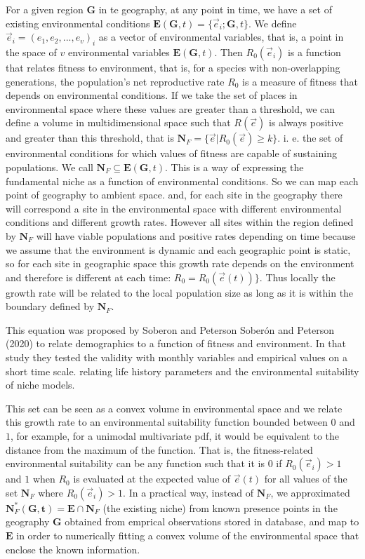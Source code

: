 \documentclass[
]{article}
\begin{document}
For a given region \(\mathbf{G}\) in te geography, at any point in time,
we have a set of existing environmental conditions
\(\mathbf{E}(\mathbf{G}, t) = \Big \{ \vec{e}_i; \mathbf{G}, t\Big \}\).
We define \(\vec{e}_i =(e_1, e_2, ..., e_v )_i\) as a vector of
environmental variables, that is, a point in the space of \(v\)
environmental variables \(\mathbf{E}(\mathbf{G}, t)\). Then
\(R_0(\vec{e}_i)\) is a function that relates fitness to environment,
that is, for a species with non-overlapping generations, the
population's net reproductive rate \(R_0\) is a measure of fitness that
depends on environmental conditions. If we take the set of places in
environmental space where these values are greater than a threshold, we
can define a volume in multidimensional space such that \(R(\vec{e})\)
is always positive and greater than this threshold, that is
\(\mathbf{N}_F=\{\vec{e} | R_0(\vec{e}) \ge k \}\). i. e. the set of
environmental conditions for which values of fitness are capable of
sustaining populations. We call
\(\mathbf{N}_F \subseteq \mathbf{E}(\mathbf{G}, t)\). This is a way of
expressing the fundamental niche as a function of environmental
conditions. So we can map each point of geography to ambient space. and,
for each site in the geography there will correspond a site in the
environmental space with different environmental conditions and
different growth rates. However all sites within the region defined by
\(\mathbf{N}_F\) will have viable populations and positive rates
depending on time because we assume that the environment is dynamic and
each geographic point is static, so for each site in geographic space
this growth rate depends on the environment and therefore is different
at each time: \(R_0 = R_0(\vec{e}(t)) \}\). Thus locally the growth rate
will be related to the local population size as long as it is within the
boundary defined by \(\mathbf{N}_F\).

This equation was proposed by Soberon and Peterson Soberón and Peterson
(2020) to relate demographics to a function of fitness and environment.
In that study they tested the validity with monthly variables and
empirical values on a short time scale. relating life history parameters
and the environmental suitability of niche models.

This set can be seen as a convex volume in environmental space and we
relate this growth rate to an environmental suitability function bounded
between \(0\) and \(1\), for example, for a unimodal multivariate pdf,
it would be equivalent to the distance from the maximum of the function.
That is, the fitness-related environmental suitability can be any
function such that it is \(0\) if \(R_0(\vec{e}_i) > 1\) and \(1\) when
\(R_0\) is evaluated at the expected value of \(\vec {e}(t)\) for all
values of the set \(\mathbf{N}_F\) where \(R_0(\vec{e}_i) > 1\). In a
practical way, instead of \(\mathbf{N}_F\), we approximated
\(\mathbf{N}_F^{*}(\mathbf{G, t}) = \mathbf{E} \cap \mathbf{N}_F\) (the
existing niche) from known presence points in the geography
\(\mathbf{G}\) obtained from emprical observations stored in database,
and map to \(\mathbf{E}\) in order to numerically fitting a convex
volume of the environmental space that enclose the known information.
\end{document}
